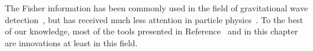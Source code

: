 \newparagraph
%
The Fisher information has been commonly used in the field of
gravitational wave detection~\cite{Jaranowski:1994xd}, but has
received much less attention in particle physics~\cite{CMS:2016kgk,
  Ferreira:2017ymn}. To the best of our knowledge, most of the tools
presented in Reference~\cite{Brehmer:2016nyr} and in this chapter are
innovations at least in this field.
%





